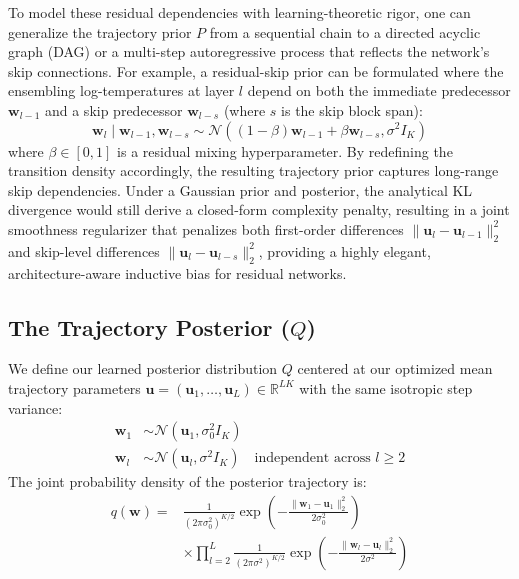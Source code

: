 To model these residual dependencies with learning-theoretic rigor, one can generalize the trajectory prior $P$ from a sequential chain to a directed acyclic graph (DAG) or a multi-step autoregressive process that reflects the network's skip connections. For example, a residual-skip prior can be formulated where the ensembling log-temperatures at layer $l$ depend on both the immediate predecessor $\mathbf{w}_{l-1}$ and a skip predecessor $\mathbf{w}_{l-s}$ (where $s$ is the skip block span):
\begin{equation}
\mathbf{w}_l \mid \mathbf{w}_{l-1}, \mathbf{w}_{l-s} \sim \mathcal{N}\left( (1-\beta) \mathbf{w}_{l-1} + \beta \mathbf{w}_{l-s}, \sigma^2 I_K \right)
\end{equation}
where $\beta \in [0, 1]$ is a residual mixing hyperparameter. By redefining the transition density accordingly, the resulting trajectory prior captures long-range skip dependencies. Under a Gaussian prior and posterior, the analytical KL divergence would still derive a closed-form complexity penalty, resulting in a joint smoothness regularizer that penalizes both first-order differences $\|\mathbf{u}_l - \mathbf{u}_{l-1}\|_2^2$ and skip-level differences $\|\mathbf{u}_l - \mathbf{u}_{l-s}\|_2^2$, providing a highly elegant, architecture-aware inductive bias for residual networks.

\subsection{The Trajectory Posterior ($Q$)}
We define our learned posterior distribution $Q$ centered at our optimized mean trajectory parameters $\mathbf{u} = (\mathbf{u}_1, \dots, \mathbf{u}_L) \in \mathbb{R}^{LK}$ with the same isotropic step variance:
\begin{align}
\mathbf{w}_1 &\sim \mathcal{N}(\mathbf{u}_1, \sigma_0^2 I_K) \\
\mathbf{w}_l &\sim \mathcal{N}(\mathbf{u}_l, \sigma^2 I_K) \quad \text{independent across } l \ge 2
\end{align}
The joint probability density of the posterior trajectory is:
\begin{align}
q(\mathbf{w}) = &\frac{1}{(2\pi \sigma_0^2)^{K/2}} \exp\left( -\frac{\|\mathbf{w}_1 - \mathbf{u}_1\|_2^2}{2\sigma_0^2} \right) \nonumber \\
&\times \prod_{l=2}^L \frac{1}{(2\pi \sigma^2)^{K/2}} \exp\left( -\frac{\|\mathbf{w}_l - \mathbf{u}_l\|_2^2}{2\sigma^2} \right)
\end{align}

